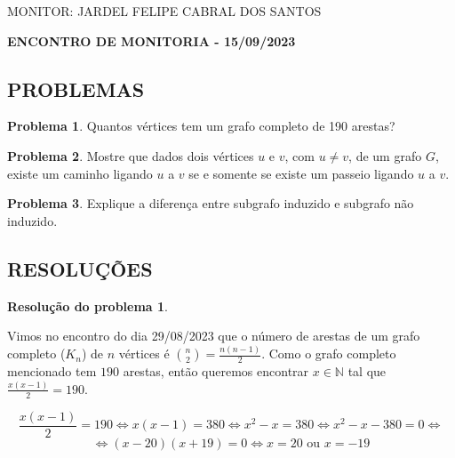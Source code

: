 \documentclass[12pt, a4paper]{article}
\theoremstyle{definition} \newtheorem{prob}{Problema}
\newtheorem{res}{Resolução do problema}
\theoremstyle{plain} \newtheorem*{teo}{Teorema}
\begin{document}
\begin{flushleft}

MONITOR: JARDEL FELIPE CABRAL DOS SANTOS\\[0.75cm] 
\end{flushleft}

\begin{center} \textbf{ENCONTRO DE MONITORIA - 15/09/2023\\[0.75cm]}
\end{center}

\begin{center}
\section*{\normalsize PROBLEMAS\\[0.25cm]} 
\end{center}

\begin{prob}
Quantos vértices tem um grafo completo de 190 arestas?
\end{prob}

\begin{prob}
Mostre que dados dois vértices \(u\) e \(v\), com \(u \neq v\), de um grafo \(G\), existe um caminho ligando \(u\) a \(v\) se
e somente se existe um passeio ligando \(u\) a \(v\).
\end{prob}

\begin{prob}
Explique a diferença entre subgrafo induzido e subgrafo não induzido.
\end{prob}

\newpage

\begin{center}
\section*{\normalsize RESOLUÇÕES\\[0.25cm]}
\end{center}

\begin{res} %
\end{res}

Vimos no encontro do dia 29/08/2023 que o número de arestas de um grafo completo (\(K_n\)) de \(n\) vértices é \(\binom{n}{2} = \frac{n(n-1)}{2}\). Como o grafo completo mencionado tem \(190\) arestas, então queremos encontrar \(x \in \mathbb{N}\) tal que \(\frac{x(x-1)}{2}=190\). 

\[\dfrac{x(x-1)}{2}=190 \Longleftrightarrow x(x-1) = 380 \Longleftrightarrow x^2 - x = 380 \Longleftrightarrow x^2 -x - 380 = 0 \Longleftrightarrow\]\[\Longleftrightarrow (x-20)(x+19) = 0
 \Longleftrightarrow x = 20 \text{ ou } x = -19\]
\end{document}
